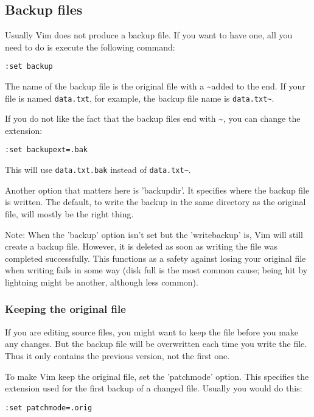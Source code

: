 \subsection{Backup files}
\label{Backup files}
Usually Vim does not produce a backup file.
If you want to have one, all you need to do is execute the following command:

 \begin{Verbatim}[samepage=true]
 :set backup
 \end{Verbatim}

The name of the backup file is the original file with a  \textasciitilde  added to the end.
If your file is named \verb!data.txt!, for example, the backup file name is \verb!data.txt~!.

If you do not like the fact that the backup files end with \textasciitilde, you can change the extension:

 \begin{Verbatim}[samepage=true]
 :set backupext=.bak
 \end{Verbatim}

This will use \verb!data.txt.bak! instead of \verb!data.txt~!.

Another option that matters here is 'backupdir'.
It specifies where the backup file is written.
The default, to write the backup in the same directory as the original file, will mostly be the right thing.

Note: When the 'backup' option isn't set but the 'writebackup' is, Vim will still create a backup file.
However, it is deleted as soon as writing the file was completed successfully.
This functions as a safety against losing your original file when writing fails in some way (disk full is the most common cause; being hit by lightning might be another, although less common).

\subsubsection{Keeping the original file}
If you are editing source files, you might want to keep the file before you make any changes.
But the backup file will be overwritten each time you write the file.
Thus it only contains the previous version, not the first one.

To make Vim keep the original file, set the 'patchmode' option.
This specifies the extension used for the first backup of a changed file.
Usually you would do this:

 \begin{Verbatim}[samepage=true]
 :set patchmode=.orig
 \end{Verbatim}

